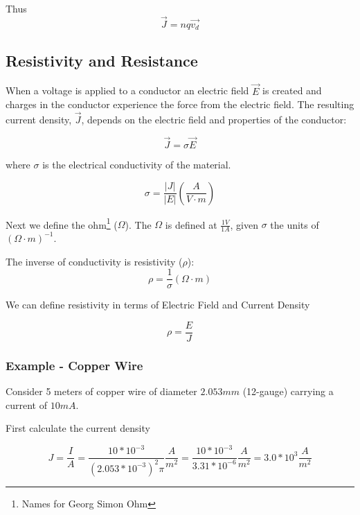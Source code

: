 \documentclass[14pt]{memoir}
\begin{document}
Thus
\begin{equation}
\vec{J} = nq \vec{v_d}
\end{equation}

\subsection{Resistivity and Resistance}

When a voltage is applied to a conductor an electric field $\vec{E}$ is created and charges in the conductor experience the force from the electric field. The resulting current density, $\vec{J}$, depends on the electric field and properties of the conductor:

\begin{equation}
\vec{J} = \sigma \vec{E}
\end{equation}

where $\sigma$ is the electrical conductivity of the material. 

\begin{equation}
\sigma = \frac{|J|}{|E|} (\frac{A}{V \cdot m})
\end{equation}

Next we define the ohm\footnote{Names for Georg Simon Ohm} ($\Omega$). The $\Omega$ is defined at $\frac{1 V}{1 A}$, given $\sigma$ the units of $(\Omega \cdot m)^{-1}$.

The inverse of conductivity is resistivity ($\rho$):
\begin{equation}
\rho = \frac{1}{\sigma} (\Omega \cdot m)
\end{equation}


We can define resistivity in terms of Electric Field and Current Density


\begin{equation}
\rho = \frac{E}{J}
\end{equation}

\subsubsection{Example - Copper Wire}

Consider 5 meters of copper wire of diameter $2.053mm$ (12-gauge) carrying a current of $10mA$.

First calculate the current density

\begin{equation}
J = \frac{I}{A} = \frac{10 * 10^{-3}}{(2.053*10^{-3})^2 \pi} \frac{A}{m^2} = \frac{10 * 10^{-3}}{3.31 * 10^{-6}} \frac{A}{m^2} =  3.0 * 10^3 \frac{A}{m^2}
\end{equation}
\end{document}
